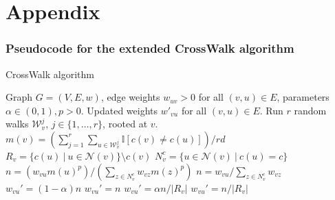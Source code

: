 
\appendix

\renewcommand \thepart{}
\renewcommand \partname{}
\part{Appendix} %
\parttoc %


\clearpage
\section{Pseudocode for the extended CrossWalk algorithm}


\begin{algorithm}
\caption{CrossWalk algorithm}
\label{alg:crosswalk}
\begin{algorithmic}[1]
\Require Graph $G = (V, E, w)$, edge weights $w_{uv}>0$ for all $(v, u) \in E$, parameters $\alpha \in (0,1), p>0$.
\Ensure Updated weights $w'_{vu}$ for all $(v, u) \in E$.
 
    \State Run $r$ random walks $\mathcal{W}_v^j$, $j \in \{ 1, \dots, r \}$, rooted at $v$.
    \State $m(v) = \left( \sum_{j = 1}^r \sum_{u \in \mathcal{W}_v^j} \mathbb{I}[c(v) \neq c(u)] \right) / rd$ 
\EndFor
{} 
    \State $R_v = \{ c(u) \ | \ u \in \mathcal{N}(v) \} \setminus c(v)$
     
        \State $N_v^{c} = \{ u \in \mathcal{N}(v) \ | \ c(u) = c \}$
         
                \State $n = \left( w_{vu} m(u)^p \right) / \left( \sum_{z \in N_v^c} w_{vz} m(z)^p \right)$ 
            \Else
                \State $n = w_{vu} / \sum_{z \in N_v^c} w_{vz}$ 
            \EndIf
             
                    \State $w_{vu}' = (1-\alpha) n$ 
                \Else
                    \State $w_{vu}' = n$ 
                \EndIf
            \Else {}
                    \State $w_{vu}' = \alpha n / |R_v|$ 
                \Else
                    \State $w_{vu}' = n / |R_v|$ 
                \EndIf
            \EndIf
        \EndFor
    \EndFor
\EndFor
\end{algorithmic}
\end{algorithm}

